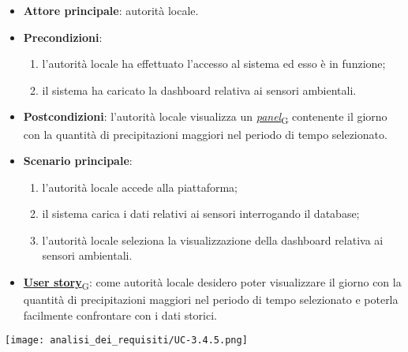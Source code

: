 \begin{itemize}
	\item \textbf{Attore principale}: autorità locale.
	\item \textbf{Precondizioni}:
	      \begin{enumerate}
		      \item l'autorità locale ha effettuato l'accesso al sistema ed esso è in funzione;
		      \item il sistema ha caricato la dashboard relativa ai sensori ambientali.
	      \end{enumerate}
	\item \textbf{Postcondizioni}: l'autorità locale visualizza un \href{https://7last.github.io/docs/pb/documentazione-interna/glossario\#panel}{\textit{panel}\textsubscript{G}} contenente il giorno con la quantità di precipitazioni maggiori nel periodo di tempo selezionato.
	\item \textbf{Scenario principale}:
	      \begin{enumerate}
		      \item l'autorità locale accede alla piattaforma;
		      \item il sistema carica i dati relativi ai sensori interrogando il database;
		      \item l'autorità locale seleziona la visualizzazione della dashboard relativa ai sensori ambientali.
	      \end{enumerate}
	\item \href{https://7last.github.io/docs/pb/documentazione-interna/glossario\#user-story}{\textbf{User story}\textsubscript{G}}:
	      come autorità locale desidero poter visualizzare il giorno con la quantità di precipitazioni maggiori nel periodo di tempo selezionato
	      e poterla facilmente confrontare con i dati storici.
\end{itemize}
\begin{center}
	\texttt{[image: analisi\_dei\_requisiti/UC-3.4.5.png]}
\end{center}


